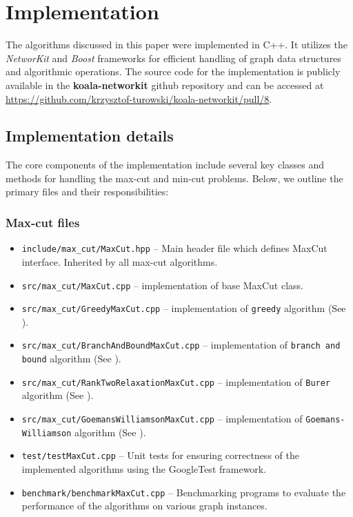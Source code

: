 \section{Implementation}

The algorithms discussed in this paper were implemented in C++. It utilizes the \textit{NetworKit} and \textit{Boost} frameworks for efficient handling of graph data structures and algorithmic operations. The source code for the implementation is publicly available in the \textbf{koala-networkit} github repository and can be accessed at \url{https://github.com/krzysztof-turowski/koala-networkit/pull/8}.

\subsection{Implementation details}

The core components of the implementation include several key classes and methods for handling the max-cut and min-cut problems. Below, we outline the primary files and their responsibilities:

\subsubsection{Max-cut files}

\begin{itemize}
    \item \texttt{include/max\_cut/MaxCut.hpp} -- Main header file which defines MaxCut interface. Inherited by all max-cut algorithms.
    \item \texttt{src/max\_cut/MaxCut.cpp} -- implementation of base MaxCut class.
    \item \texttt{src/max\_cut/GreedyMaxCut.cpp} -- implementation of \texttt{greedy} algorithm (See ).
    \item \texttt{src/max\_cut/BranchAndBoundMaxCut.cpp} -- implementation of \texttt{branch and bound} algorithm (See ).
    \item \texttt{src/max\_cut/RankTwoRelaxationMaxCut.cpp} -- implementation of \texttt{Burer} algorithm (See ).
    \item \texttt{src/max\_cut/GoemansWilliamsonMaxCut.cpp} -- implementation of \texttt{Goemans-Williamson} algorithm (See ).
    \item \texttt{test/testMaxCut.cpp} -- Unit tests for ensuring correctness of the implemented algorithms using the GoogleTest framework.
    \item \texttt{benchmark/benchmarkMaxCut.cpp} -- Benchmarking programs to evaluate the performance of the algorithms on various graph instances.
\end{itemize}

